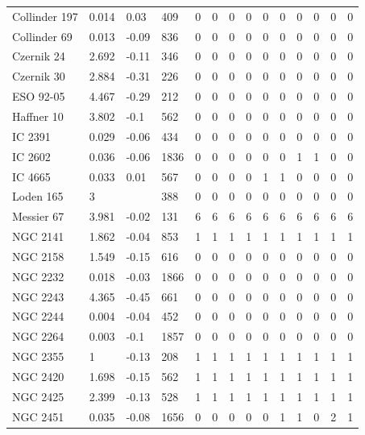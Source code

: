 \begin{longtable}[c]{|l l l l || c c c c c c c c c c|}
		Collinder 197 & 0.014 & 0.03 & 409 & 0 & 0 & 0 & 0 & 0 & 0 & 0 & 0 & 0 & 0\\
		Collinder 69 & 0.013 & -0.09 & 836 & 0 & 0 & 0 & 0 & 0 & 0 & 0 & 0 & 0 & 0\\
		Czernik 24 & 2.692 & -0.11 & 346 & 0 & 0 & 0 & 0 & 0 & 0 & 0 & 0 & 0 & 0\\
		Czernik 30 & 2.884 & -0.31 & 226 & 0 & 0 & 0 & 0 & 0 & 0 & 0 & 0 & 0 & 0\\
		ESO 92-05 & 4.467 & -0.29 & 212 & 0 & 0 & 0 & 0 & 0 & 0 & 0 & 0 & 0 & 0\\
		Haffner 10 & 3.802 & -0.1 & 562 & 0 & 0 & 0 & 0 & 0 & 0 & 0 & 0 & 0 & 0\\
		IC 2391 & 0.029 & -0.06 & 434 & 0 & 0 & 0 & 0 & 0 & 0 & 0 & 0 & 0 & 0\\
		\rowcolor{lightgray}
		IC 2602 & 0.036 & -0.06 & 1836 & 0 & 0 & 0 & 0 & 0 & 0 & 1 & 1 & 0 & 0\\
		\rowcolor{lightgray}
		IC 4665 & 0.033 & 0.01 & 567 & 0 & 0 & 0 & 0 & 1 & 1 & 0 & 0 & 0 & 0\\
		Loden 165 & 3 &  & 388 & 0 & 0 & 0 & 0 & 0 & 0 & 0 & 0 & 0 & 0\\
		\rowcolor{lightgray}
		Messier 67 & 3.981 & -0.02 & 131 & 6 & 6 & 6 & 6 & 6 & 6 & 6 & 6 & 6 & 6\\
		\rowcolor{lightgray}
		NGC 2141 & 1.862 & -0.04 & 853 & 1 & 1 & 1 & 1 & 1 & 1 & 1 & 1 & 1 & 1\\
		NGC 2158 & 1.549 & -0.15 & 616 & 0 & 0 & 0 & 0 & 0 & 0 & 0 & 0 & 0 & 0\\
		NGC 2232 & 0.018 & -0.03 & 1866 & 0 & 0 & 0 & 0 & 0 & 0 & 0 & 0 & 0 & 0\\
		NGC 2243 & 4.365 & -0.45 & 661 & 0 & 0 & 0 & 0 & 0 & 0 & 0 & 0 & 0 & 0\\
		NGC 2244 & 0.004 & -0.04 & 452 & 0 & 0 & 0 & 0 & 0 & 0 & 0 & 0 & 0 & 0\\
		NGC 2264 & 0.003 & -0.1 & 1857 & 0 & 0 & 0 & 0 & 0 & 0 & 0 & 0 & 0 & 0\\
		\rowcolor{lightgray}
		NGC 2355 & 1 & -0.13 & 208 & 1 & 1 & 1 & 1 & 1 & 1 & 1 & 1 & 1 & 1\\
		\rowcolor{lightgray}
		NGC 2420 & 1.698 & -0.15 & 562 & 1 & 1 & 1 & 1 & 1 & 1 & 1 & 1 & 1 & 1\\
		\rowcolor{lightgray}
		NGC 2425 & 2.399 & -0.13 & 528 & 1 & 1 & 1 & 1 & 1 & 1 & 1 & 1 & 1 & 1\\
		\rowcolor{lightgray}
		NGC 2451 & 0.035 & -0.08 & 1656 & 0 & 0 & 0 & 0 & 0 & 1 & 1 & 0 & 2 & 1\\

\end{longtable}
